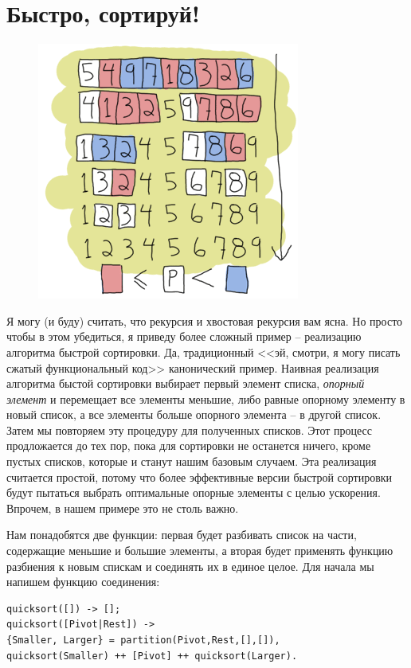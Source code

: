 \documentclass[a4paper,12pt]{report}
\begin{document}
\section{Быстро, сортируй!}
\begin{figure}
    \includegraphics[width=1\linewidth]{quicksort.png}
\end{figure}
Я могу (и буду) считать, что рекурсия и хвостовая рекурсия вам ясна. Но просто чтобы в этом убедиться, я приведу более сложный пример \--- реализацию алгоритма быстрой сортировки. Да, традиционный <<эй, смотри, я могу писать сжатый функциональный код>> канонический пример. Наивная реализация алгоритма быстой сортировки выбирает первый элемент списка, \emph{опорный элемент} и перемещает все элементы меньшие, либо равные опорному элементу в новый список, а все элементы больше опорного элемента \--- в другой список. Затем мы повторяем эту процедуру для полученных списков. Этот процесс продложается до тех пор, пока для сортировки не останется ничего, кроме пустых списков, которые и станут нашим базовым случаем. Эта реализация считается простой, потому что более эффективные версии быстрой сортировки будут пытаться выбрать оптимальные опорные элементы с целью ускорения. Впрочем, в нашем примере это не столь важно.

Нам понадобятся две функции: первая будет разбивать список на части, содержащие меньшие и большие элементы, а вторая будет применять функцию разбиения к новым спискам и соединять их в единое целое. Для начала мы напишем функцию соединения:
\begin{lstlisting}[style=erlang]
quicksort([]) -> [];
quicksort([Pivot|Rest]) ->
{Smaller, Larger} = partition(Pivot,Rest,[],[]),
quicksort(Smaller) ++ [Pivot] ++ quicksort(Larger).
\end{lstlisting}
\end{document}
